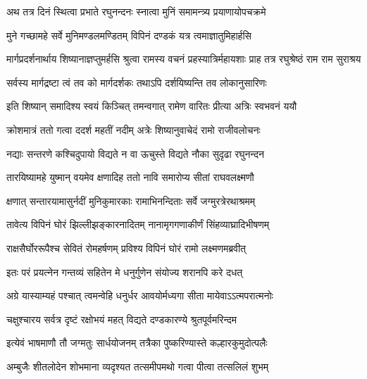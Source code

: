 



\twolineshloka
{अथ तत्र दिनं स्थित्वा प्रभाते रघुनन्दनः}
{स्नात्वा मुनिं समामन्त्र्य प्रयाणायोपचक्रमे} %

\twolineshloka
{मुने गच्छामहे सर्वे मुनिमण्डलमण्डितम्}
{विपिनं दण्डकं यत्र त्वमाज्ञातुमिहार्हसि} %

\threelineshloka
{मार्गप्रदर्शनार्थाय शिष्यानाज्ञप्तुमर्हसि}
{श्रुत्वा रामस्य वचनं प्रहस्यात्रिर्महायशाः}
{प्राह तत्र रघुश्रेष्ठं राम राम सुराश्रय} %

\twolineshloka
{सर्वस्य मार्गद्रष्टा त्वं तव को मार्गदर्शकः}
{तथाऽपि दर्शयिष्यन्ति तव लोकानुसारिणः} %

\twolineshloka
{इति शिष्यान् समादिश्य स्वयं किञ्चित् तमन्वगात्}
{रामेण वारितः प्रीत्या अत्रिः स्वभवनं ययौ} %

\twolineshloka
{क्रोशमात्रं ततो गत्वा ददर्श महतीं नदीम्}
{अत्रेः शिष्यानुवाचेदं रामो राजीवलोचनः} %

\twolineshloka
{नद्याः सन्तरणे कश्चिदुपायो विद्यते न वा}
{ऊचुस्ते विद्यते नौका सुदृढा रघुनन्दन} %

\twolineshloka
{तारयिष्यामहे युष्मान् वयमेव क्षणादिह}
{ततो नावि समारोप्य सीतां राघवलक्ष्मणौ} %

\twolineshloka
{क्षणात् सन्तारयामासुर्नदीं मुनिकुमारकाः}
{रामाभिनन्दिताः सर्वे जग्मुरत्रेरथाश्रमम्} %

\twolineshloka
{तावेत्य विपिनं घोरं झिल्लीझङ्कारनादितम्}
{नानामृगगणाकीर्णं सिंहव्याघ्रादिभीषणम्} %

\twolineshloka
{राक्षसैर्घोररूपैश्च सेवितं रोमहर्षणम्}
{प्रविश्य विपिनं घोरं रामो लक्ष्मणमब्रवीत्} %

\twolineshloka
{इतः परं प्रयत्नेन गन्तव्यं सहितेन मे}
{धनुर्गुणेन संयोज्य शरानपि करे दधत्} %

\twolineshloka
{अग्रे यास्याम्यहं पश्चात् त्वमन्वेहि धनुर्धर}
{आवयोर्मध्यगा सीता मायेवाऽऽत्मपरात्मनोः} %

\twolineshloka
{चक्षुश्चारय सर्वत्र दृष्टं रक्षोभयं महत्}
{विद्यते दण्डकारण्ये श्रुतपूर्वमरिन्दम} %

\twolineshloka
{इत्येवं भाषमाणौ तौ जग्मतुः सार्धयोजनम्}
{तत्रैका पुष्करिण्यास्ते कल्हारकुमुदोत्पलैः} %

\twolineshloka
{अम्बुजैः शीतलोदेन शोभमाना व्यदृश्यत}
{तत्समीपमथो गत्वा पीत्वा तत्सलिलं शुभम्} %

